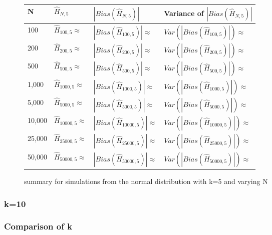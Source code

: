 \documentclass{article}
\begin{document}
\begin{figure} 
 \begin{adjustwidth}{-2cm}{}
\begin{tabular}{|l|l|l|l|}
\hline
N & $\hat{H}_{N, 5}$ & $|Bias(\hat{H}_{N, 5})|$ & Variance of $|Bias(\hat{H}_{N, 5})|$ \\
\hline
100 & $\hat{H}_{100, 5} \approx $ & $|Bias(\hat{H}_{100, 5})| \approx $ & $Var(|Bias(\hat{H}_{100, 5})|) \approx $\\
200 & $\hat{H}_{200, 5} \approx $ & $|Bias(\hat{H}_{200, 5})| \approx $ & $Var(|Bias(\hat{H}_{200, 5})|) \approx $\\
500 & $\hat{H}_{500, 5} \approx $ & $|Bias(\hat{H}_{500, 5})| \approx $ & $Var(|Bias(\hat{H}_{500, 5})|) \approx $\\
1,000 & $\hat{H}_{1000, 5} \approx $ & $|Bias(\hat{H}_{1000, 5})| \approx $ & $Var(|Bias(\hat{H}_{1000, 5})|) \approx $\\
5,000 & $\hat{H}_{5000, 5} \approx $ & $|Bias(\hat{H}_{5000, 5})| \approx $ & $Var(|Bias(\hat{H}_{5000, 5})|) \approx $\\
10,000 & $\hat{H}_{10000, 5} \approx $ & $|Bias(\hat{H}_{10000, 5})| \approx $ & $Var(|Bias(\hat{H}_{10000, 5})|) \approx $\\
25,000 & $\hat{H}_{25000, 5} \approx $ & $|Bias(\hat{H}_{25000, 5})| \approx $ & $Var(|Bias(\hat{H}_{25000, 5})|) \approx $\\
50,000 & $\hat{H}_{50000, 5} \approx $ & $|Bias(\hat{H}_{50000, 5})| \approx $ & $Var(|Bias(\hat{H}_{50000, 5})|) \approx $\\
\hline
\end{tabular}
\caption{\label{fig:normal_k=5} summary for simulations from the normal distribution with k=5 and varying N}
 \end{adjustwidth}
\end{figure}

\subsubsection{k=10}

\subsubsection{Comparison of k}
\end{document}
